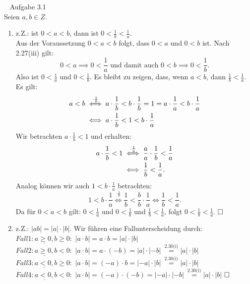\begin{lsg}\mbox{ }
Aufgabe 3.1 \\
Seien \(a,b \in Z\).
\begin{enumerate}[label=$\mathrm{(\roman*)}$, ref=$\mathrm{\roman*}$] 
	\item z.Z.: ist \(0<a<b\), dann ist \(0<\frac{1}{b}<\frac{1}{a}\). \\
		Aus der Voraussetzung \(0<a<b\) folgt, dass  \(0<a\) und \(0<b\) ist. Nach 2.27(iii) gilt: \[0<a\implies 0<\frac{1}{a} \text{ und damit auch } 0<b\implies 0<\frac{1}{b}.\]
		Also ist \(0<\frac{1}{a}\) und \(0<\frac{1}{b}\). Es bleibt zu zeigen, dass, wenn \(a<b\), dann \(\frac{1}{b}<\frac{1}{a}\). \\
		Es gilt: 
		\begin{align} a<b &\overset{\cdot \frac{1}{b}}{\iff} a \cdot \frac{1}{b} < b \cdot \frac{1}{b} = 1 = a \cdot \frac{1}{a} < b \cdot \frac{1}{a} \notag \\ &\iff a \cdot \frac{1}{b} < 1 < b \cdot \frac{1}{a} \notag \end{align}
		Wir betrachten \(a \cdot \frac{1}{b} < 1 \) und erhalten: \begin{align} a \cdot \frac{1}{b} < 1 &\overset{\cdot \frac{1}{a}}{\iff} \frac{a}{a} \cdot \frac{1}{b}<\frac{1}{a} \notag \\ &\iff \frac{1}{b}<\frac{1}{a}. \notag \end{align}
		Analog können wir auch \(1 < b \cdot \frac{1}{a}\) betrachten: \[1 < b \cdot \frac{1}{a} \overset{\cdot \frac{1}{b}}{\iff} \frac{1}{b} < \frac{b}{b}\cdot\frac{1}{a} \iff \frac{1}{b}<\frac{1}{a}.\]
		Da für \(0<a<b\) gilt: \(0<\frac{1}{a}\) und \(0<\frac{1}{b}\) und \(\frac{1}{b}<\frac{1}{a}\), folgt  \(0<\frac{1}{b}<\frac{1}{a}\). \(\hfill \square\)
	\item z.Z.: \(|ab|=|a|\cdot |b|\). Wir führen eine Fallunterscheidung durch: \\
		\(\underline{Fall 1: a\geq 0, b\geq 0:}\) \quad \(|a\cdot b| = a \cdot b = |a|\cdot |b|\) \\
		\(\underline{Fall 2: a\geq 0, b< 0:}\) \quad \(|a\cdot b| = a \cdot (-b) = |a|\cdot |-b|\ \overset{\text{2.30(i)}}{=} |a|\cdot |b|\) \\
		\(\underline{Fall 3: a< 0, b\geq 0:}\) \quad \(|a\cdot b| = (-a) \cdot b = |-a|\cdot |b|\ \overset{\text{2.30(i)}}{=} |a|\cdot |b|\) \\
		\(\underline{Fall 4: a< 0, b< 0:}\) \quad \(|a\cdot b| = (-a) \cdot (-b) = |-a|\cdot |-b|\ \overset{\text{2.30(i)}}{=} |a|\cdot |b|\) \(\hfill \square\) \\

\end{enumerate}
\end{lsg}
